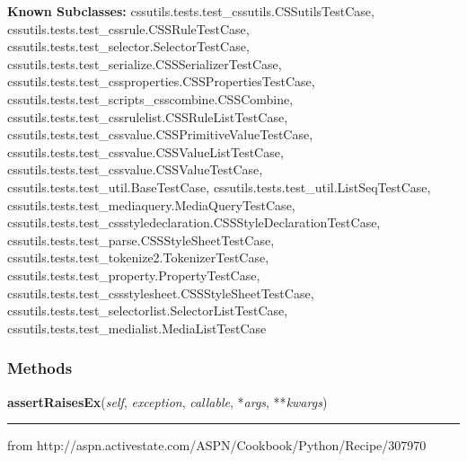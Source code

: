 \textbf{Known Subclasses:}
cssutils.tests.test\_cssutils.CSSutilsTestCase,
    cssutils.tests.test\_cssrule.CSSRuleTestCase,
    cssutils.tests.test\_selector.SelectorTestCase,
    cssutils.tests.test\_serialize.CSSSerializerTestCase,
    cssutils.tests.test\_cssproperties.CSSPropertiesTestCase,
    cssutils.tests.test\_scripts\_csscombine.CSSCombine,
    cssutils.tests.test\_cssrulelist.CSSRuleListTestCase,
    cssutils.tests.test\_cssvalue.CSSPrimitiveValueTestCase,
    cssutils.tests.test\_cssvalue.CSSValueListTestCase,
    cssutils.tests.test\_cssvalue.CSSValueTestCase,
    cssutils.tests.test\_util.BaseTestCase,
    cssutils.tests.test\_util.ListSeqTestCase,
    cssutils.tests.test\_mediaquery.MediaQueryTestCase,
    cssutils.tests.test\_cssstyledeclaration.CSSStyleDeclarationTestCase,
    cssutils.tests.test\_parse.CSSStyleSheetTestCase,
    cssutils.tests.test\_tokenize2.TokenizerTestCase,
    cssutils.tests.test\_property.PropertyTestCase,
    cssutils.tests.test\_cssstylesheet.CSSStyleSheetTestCase,
    cssutils.tests.test\_selectorlist.SelectorListTestCase,
    cssutils.tests.test\_medialist.MediaListTestCase



  \subsubsection{Methods}

    \label{cssutils:tests:basetest:BaseTestCase:assertRaisesEx}

    \vspace{0.5ex}

\hspace{.8\funcindent}\begin{boxedminipage}{\funcwidth}

    \raggedright \textbf{assertRaisesEx}(\textit{self}, \textit{exception}, \textit{callable}, *\textit{args}, **\textit{kwargs})

    \vspace{-1.5ex}

    \rule{\textwidth}{0.5\fboxrule}
\setlength{\parskip}{2ex}
    from http://aspn.activestate.com/ASPN/Cookbook/Python/Recipe/307970

\setlength{\parskip}{1ex}
    \end{boxedminipage}

